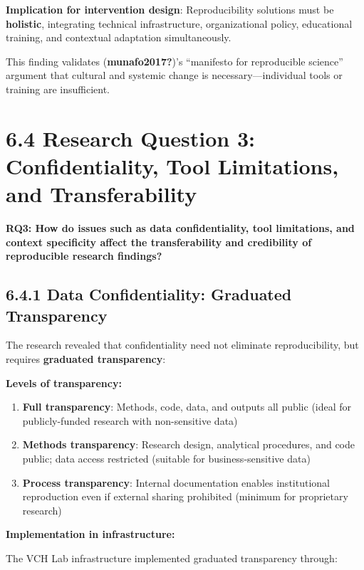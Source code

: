 \documentclass[
  oneside,
  open=any]{scrbook}
\begin{document}
\textbf{Implication for intervention design}: Reproducibility solutions
must be \textbf{holistic}, integrating technical infrastructure,
organizational policy, educational training, and contextual adaptation
simultaneously.

This finding validates (\textbf{munafo2017?})'s ``manifesto for
reproducible science'' argument that cultural and systemic change is
necessary---individual tools or training are insufficient.

\section{6.4 Research Question 3: Confidentiality, Tool Limitations, and
Transferability}\label{research-question-3-confidentiality-tool-limitations-and-transferability}

\textbf{RQ3: How do issues such as data confidentiality, tool
limitations, and context specificity affect the transferability and
credibility of reproducible research findings?}

\subsection{6.4.1 Data Confidentiality: Graduated
Transparency}\label{data-confidentiality-graduated-transparency}

The research revealed that confidentiality need not eliminate
reproducibility, but requires \textbf{graduated transparency}:

\textbf{Levels of transparency:}

\begin{enumerate}
\def\labelenumi{\arabic{enumi}.}
\item
  \textbf{Full transparency}: Methods, code, data, and outputs all
  public (ideal for publicly-funded research with non-sensitive data)
\item
  \textbf{Methods transparency}: Research design, analytical procedures,
  and code public; data access restricted (suitable for
  business-sensitive data)
\item
  \textbf{Process transparency}: Internal documentation enables
  institutional reproduction even if external sharing prohibited
  (minimum for proprietary research)
\end{enumerate}

\textbf{Implementation in infrastructure:}

The VCH Lab infrastructure implemented graduated transparency through:
\end{document}
